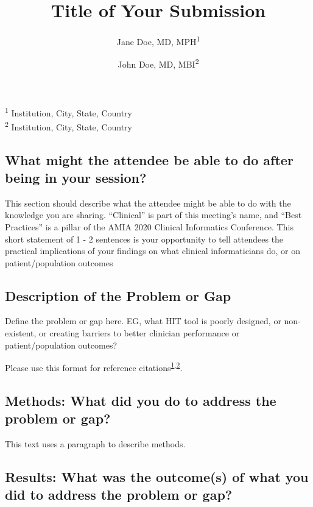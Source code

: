 \documentclass[
]{article}
\title{\textbf{Title of Your Submission}}
\author{Jane Doe, MD, MPH\textsuperscript{1} \and John Doe, MD, MBI\textsuperscript{2}}
\date{}
\begin{document}
\maketitle

\textsuperscript{1} Institution, City, State, Country\\
\textsuperscript{2} Institution, City, State, Country

\hypertarget{what-might-the-attendee-be-able-to-do-after-being-in-your-session}{%
\subsection{What might the attendee be able to do after being in your session?}\label{what-might-the-attendee-be-able-to-do-after-being-in-your-session}}

This section should describe what the attendee might be able to do with the knowledge you are sharing. ``Clinical'' is part of this meeting's name, and ``Best Practices'' is a pillar of the AMIA 2020 Clinical Informatics Conference. This short statement of 1 - 2 sentences is your opportunity to tell attendees the practical implications of your findings on what clinical informaticians do, or on patient/population outcomes

\hypertarget{description-of-the-problem-or-gap}{%
\subsection{Description of the Problem or Gap}\label{description-of-the-problem-or-gap}}

Define the problem or gap here. EG, what HIT tool is poorly designed, or non-existent, or creating barriers to better clinician performance or patient/population outcomes?

Please use this format for reference citations\textsuperscript{\protect\hyperlink{ref-pryor_help_1983}{1},\protect\hyperlink{ref-gardner_computer-critiqued_1990}{2}}.

\hypertarget{methods-what-did-you-do-to-address-the-problem-or-gap}{%
\subsection{Methods: What did you do to address the problem or gap?}\label{methods-what-did-you-do-to-address-the-problem-or-gap}}

This text uses a paragraph to describe methods.

\hypertarget{results-what-was-the-outcomes-of-what-you-did-to-address-the-problem-or-gap}{%
\subsection{Results: What was the outcome(s) of what you did to address the problem or gap?}\label{results-what-was-the-outcomes-of-what-you-did-to-address-the-problem-or-gap}}
\end{document}
